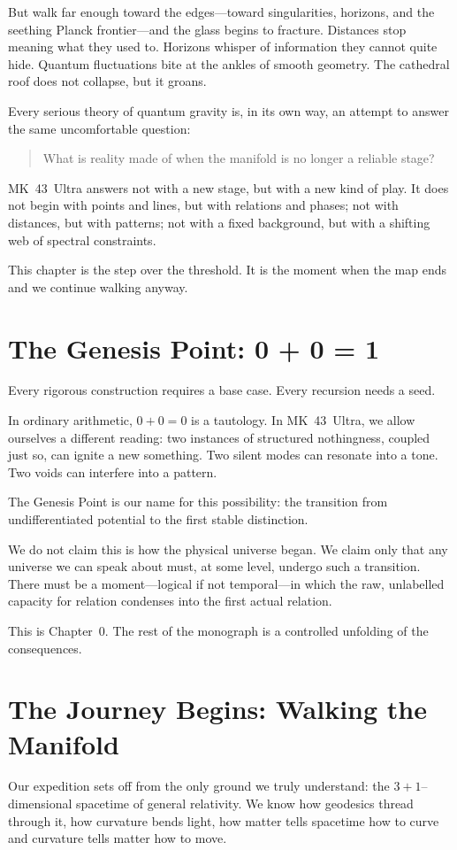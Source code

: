 But walk far enough toward the edges—toward singularities, horizons, and the seething Planck
frontier—and the glass begins to fracture. Distances stop meaning what they used to. Horizons
whisper of information they cannot quite hide. Quantum fluctuations bite at the ankles of smooth
geometry. The cathedral roof does not collapse, but it groans.

Every serious theory of quantum gravity is, in its own way, an attempt to answer the same
uncomfortable question:

\begin{quote}
What is reality made of when the manifold is no longer a reliable stage?
\end{quote}

MK~43~Ultra answers not with a new stage, but with a new kind of play. It does not begin with
points and lines, but with relations and phases; not with distances, but with patterns; not with
a fixed background, but with a shifting web of spectral constraints.

This chapter is the step over the threshold. It is the moment when the map ends and we continue
walking anyway.

\section{The Genesis Point: 0 + 0 = 1}
Every rigorous construction requires a base case. Every recursion needs a seed.

In ordinary arithmetic, $0 + 0 = 0$ is a tautology. In MK~43~Ultra, we allow ourselves a different
reading: two instances of structured nothingness, coupled just so, can ignite a new something.
Two silent modes can resonate into a tone. Two voids can interfere into a pattern.

The Genesis Point is our name for this possibility: the transition from undifferentiated potential
to the first stable distinction.

We do not claim this is how the physical universe began. We claim only that any universe we can
speak about must, at some level, undergo such a transition. There must be a moment—logical if not
temporal—in which the raw, unlabelled capacity for relation condenses into the first actual
relation.

This is Chapter~0. The rest of the monograph is a controlled unfolding of the consequences.

\section{The Journey Begins: Walking the Manifold}
Our expedition sets off from the only ground we truly understand: the $3+1$–dimensional
spacetime of general relativity. We know how geodesics thread through it, how curvature bends
light, how matter tells spacetime how to curve and curvature tells matter how to move.

